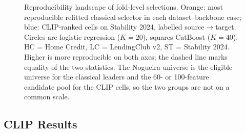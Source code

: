 \documentclass[final,5p,twocolumn]{elsarticle}
\newcommand{\Kfeat}{K}
\begin{document}
\begin{figure}[htbp]
\caption{Reproducibility landscape of fold-level selections. Orange: most reproducible refitted classical selector in each dataset--backbone case; blue: CLIP-ranked cells on Stability 2024, labelled source$\rightarrow$target. Circles are logistic regression ($\Kfeat=20$), squares CatBoost ($\Kfeat=40$). HC = Home Credit, LC = LendingClub v2, ST = Stability 2024. Higher is more reproducible on both axes; the dashed line marks equality of the two statistics. The Nogueira universe is the eligible universe for the classical leaders and the 60- or 100-feature candidate pool for the CLIP cells, so the two groups are not on a common scale.}
\label{fig:stability}
\end{figure}

\subsection{CLIP Results}
\label{subsec:clip_results}
\end{document}
